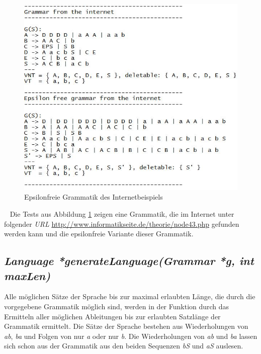 \documentclass[11pt, a4paper, twoside]{article}   	%
\begin{document}
\ \newpage
\begin{figure}[h]
\centering
\includegraphics[scale=0.80]{tests_epsilon_free_2.JPG}
\caption{Epsilonfreie Grammatik des Internetbeispiels}
\label{fig:internet-epsilon-free}
\end{figure}
\ \newline
Die Tests aus Abbildung \ref{fig:internet-epsilon-free} zeigen eine Grammatik, die im Internet unter folgender \emph{URL} \url{http://www.informatikseite.de/theorie/node43.php} gefunden werden kann und die epsilonfreie Variante dieser Grammatik. 
\newpage

\subsection{\emph{Language *generateLanguage(Grammar *g, int maxLen)}}
\label{sec:generate-language-subsec}
Alle möglichen Sätze der Sprache bis zur maximal erlaubten Länge, die durch die vorgegebene Grammatik möglich sind, werden in der Funktion  durch das Ermitteln aller möglichen Ableitungen bis zur erlaubten Satzlänge der Grammatik ermittelt.
\newline
\newline
Die Sätze der Sprache bestehen aus Wiederholungen von \emph{ab}, \emph{ba} und Folgen von nur \emph{a} oder nur \emph{b}. Die Wiederholungen von \emph{ab} und \emph{ba} lassen sich schon aus der Grammatik aus den beiden Sequenzen \emph{bS} und \emph{aS} auslesen. 
\end{document}
